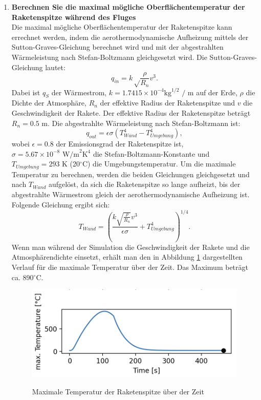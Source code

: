 \documentclass[12pt]{article}
\begin{document}
\begin{enumerate}
    \item \textbf{Berechnen Sie die maximal mögliche Oberflächentemperatur der Raketenspitze während des Fluges}\\
    Die maximal mögliche Oberflächentemperatur der Raketenspitze kann errechnet werden, indem die aerothermodynamische Aufheizung mittels der Sutton-Graves-Gleichung berechnet wird und mit der abgestrahlten Wärmeleistung nach Stefan-Boltzmann gleichgesetzt wird. Die Sutton-Graves-Gleichung lautet:
    \begin{equation}
        q_{in} = k \sqrt\frac{\rho}{R_n} v^3.
    \end{equation}
    Dabei ist $q_S$ der Wärmestrom, $k = 1.7415 \times 10^{-4} \text{kg}^{1/2} \text{ / m}$ auf der Erde, $\rho$ die Dichte der Atmosphäre, $R_n$ der effektive Radius der Raketenspitze und $v$ die Geschwindigkeit der Rakete. Der effektive Radius der Raketenspitze beträgt $R_n = 0.5 \text{ m}$. Die abgestrahlte Wärmeleistung nach Stefan-Boltzmann ist: 
    \begin{equation}
        q_{out} = \epsilon \sigma (T_{Wand}^4 - T_{Umgebung}^4),
    \end{equation}
    wobei $\epsilon = 0.8$ der Emissionsgrad der Raketenspitze ist, $\sigma = 5.67 \times 10^{-8} \text{ W/m}^2 \text{K}^4$ die Stefan-Boltzmann-Konstante und $T_{Umgebung} = 293 \text{ K}$ (20$^\circ$C) die Umgebungstemperatur. Um die maximale Temperatur zu berechnen, werden die beiden Gleichungen gleichgesetzt und nach $T_{Wand}$ aufgelöst, da sich die Raketenspitze so lange aufheizt, bis der abgestrahlte Wärmestrom gleich der aerothermodynamische Aufheizung ist. Folgende Gleichung ergibt sich:
    \begin{equation}
        T_{Wand} = \left( \frac{k \sqrt{\frac{\rho}{R_n}}v^3}{\epsilon \sigma} + T_{Umgebung}^4 \right)^{1/4}.
    \end{equation}
    Wenn man während der Simulation die Geschwindigkeit der Rakete und die Atmosphärendichte einsetzt, erhält man den in Abbildung \ref{fig:max_temp} dargestellten Verlauf für die maximale Temperatur über der Zeit. Das Maximum beträgt ca. 890$^\circ$C.
    \begin{figure}
        \centering
        \includegraphics[width=.8\textwidth]{images/max_temp.png}
        \label{fig:max_temp}
        \caption{Maximale Temperatur der Raketenspitze über der Zeit}
    \end{figure}


\end{enumerate}
\end{document}

